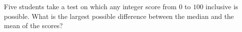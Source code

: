 Five students take a test on which any integer score from $0$ to $100$ inclusive is possible. What is the largest possible difference between the median and the mean of the scores?